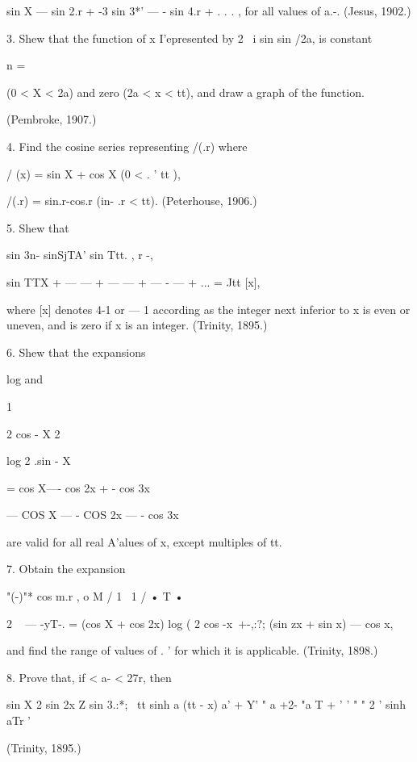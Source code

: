{sin X — sin 2.r + -3 sin 3*' — - sin 4.r + . . . , for all values of
a.-. (Jesus, 1902.)

3. Shew that the function of x I'epresented by 2 ~i sin sin /2a, is
constant

n = \

(0 < X < 2a) and zero (2a < x < tt), and draw a graph of the function.

(Pembroke, 1907.)

4. Find the cosine series representing /(.r) where

/ (x) = sin X + cos X (0 < . ' tt ),

/(.r) = sin.r-cos.r (in- .r < tt). (Peterhouse, 1906.)

5. Shew that

sin 3n- sinSjTA' sin Ttt. , r -,

sin TTX + — — + — — + — - — + ... = Jtt [x],

where [x] denotes 4-1 or — 1 according as the integer next inferior to
x is even or uneven, and is zero if x is an integer. (Trinity, 1895.)

6. Shew that the expansions



log and



1

2 cos - X 2



log 2 .sin - X



= cos X—- cos 2x + - cos 3x



— COS X — - COS 2x — - cos 3x



are valid for all real A'alues of x, except multiples of tt.

7. Obtain the expansion

"(-)"* cos m.r , o M / 1 \ 1 / • T • \

2 ~ — -yT-. = (cos X + cos 2x) log ( 2 cos -x\ +-,:?; (sin zx + sin x)
— cos x,

and find the range of values of . ' for which it is applicable.
(Trinity, 1898.)

8. Prove that, if < a- < 27r, then



sin X 2 sin 2x Z sin 3.:*; \ tt sinh a (tt - x) a' + Y' " a +2- "a T +
' ' " " 2 ' sinh aTr '



(Trinity, 1895.)



}
